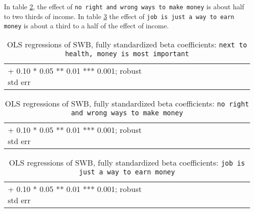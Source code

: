 \documentclass[10pt, letterpaper]{article}
\begin{document}
\begin{spacing}{1.8}
In table \ref{betac}, the effect of \texttt{no right  and wrong ways to make money} is about half to two thirds of income. In table \ref{betad} the effect of \texttt{job is just a way to earn money} is about a third to a half of the effect of income.

\begin{spacing}{.9} \begin{table}[H]\centering   \begin{scriptsize} \begin{tabular}{p{1.8in}p{.5in}p{.5in}p{.5in}p{.5in}p{.5in}p{.5in}p{.5in}p{.5in}p{.5in}p{.5 in}p{.5in}p{.5 in}}\hline  \hline + 0.10 * 0.05 ** 0.01 *** 0.001; robust std err \end{tabular}\end{scriptsize}\caption{\label{betab}OLS regressions of SWB, fully standardized beta coefficients: \texttt{next to  health, money is most  important}}\end{table} \end{spacing}

\begin{spacing}{.9} \begin{table}[H]\centering   \begin{scriptsize} \begin{tabular}{p{1.8in}p{.5in}p{.5in}p{.5in}p{.5in}p{.5in}p{.5in}p{.5in}p{.5in}p{.5in}p{.5 in}p{.5in}p{.5 in}}\hline  \hline + 0.10 * 0.05 ** 0.01 *** 0.001; robust std err \end{tabular}\end{scriptsize}\caption{\label{betac}OLS regressions of SWB, fully standardized beta coefficients: \texttt{no right  and wrong ways to  make money}}\end{table} \end{spacing}

\begin{spacing}{.9} \begin{table}[H]\centering   \begin{scriptsize} \begin{tabular}{p{1.8in}p{.5in}p{.5in}p{.5in}p{.5in}p{.5in}p{.5in}p{.5in}p{.5in}p{.5in}p{.5 in}p{.5in}p{.5 in}}\hline  \hline + 0.10 * 0.05 ** 0.01 *** 0.001; robust std err \end{tabular}\end{scriptsize}\caption{\label{betad}OLS regressions of SWB, fully standardized beta coefficients: \texttt{job is just a way to earn money}}\end{table} \end{spacing}



\end{spacing}
\end{document}
